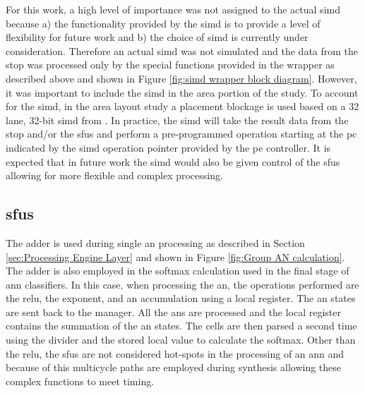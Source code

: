 For this work, a high level of importance was not assigned to the actual \ac{simd} because a) the functionality provided by the \ac{simd} is to provide a level of flexibility for future work and b) the choice of \ac{simd} is currently under consideration.
Therefore an actual \ac{simd} was not simulated and the data from the \ac{stop} was processed only by the special functions provided in the wrapper as described above and shown in Figure \ref{fig:simd wrapper block diagram}.
However, it was important to include the \ac{simd} in the area portion of the study.
To account for the \ac{simd}, in the area layout study a placement blockage is used based on a 32 lane, 32-bit \ac{simd} from \cite{schabel2016processor}.
In practice, the \ac{simd} will take the result data from the \ac{stop} and/or the \acp{sfu} and perform a pre-programmed operation starting at the \ac{pc} indicated by the \ac{simd} operation pointer provided by the \ac{pe} controller.
It is expected that in future work the \ac{simd} would also be given control of the \acp{sfu} allowing for more flexible and complex processing.

\subsection{\Acp{sfu}}
\label{sec:sfu}

The adder is used during single \ac{an} processing as described in Section \ref{sec:Processing Engine Layer} and shown in Figure \ref{fig:Group AN calculation}.
The adder is also employed in the softmax calculation used in the final stage of \ac{ann} classifiers.
In this case, when processing the \ac{an}, the operations performed are the \ac{relu}, the exponent, and an accumulation using a local register. The \ac{an} states are sent back to the manager.
All the \acp{an} are processed and the local register contains the summation of the \ac{an} states. 
The cells are then parsed a second time using the divider and the stored local value to calculate the softmax.
Other than the \ac{relu}, the \acp{sfu} are not considered hot-spots in the processing of an \ac{ann} and because of this multicycle paths are employed during synthesis allowing these complex functions to meet timing.



